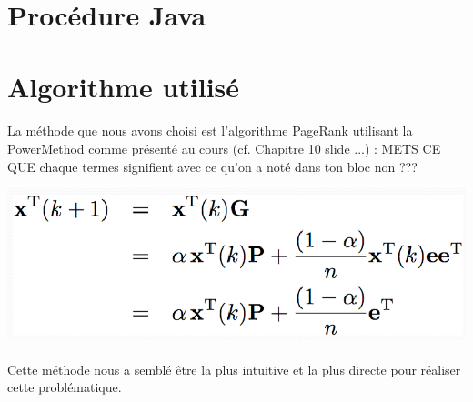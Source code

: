 \documentclass[10pt,a4paper]{article}
\begin{document}



\newpage

\section{Procédure Java}
\section{Algorithme utilisé}

\paragraph{}La méthode que nous avons choisi est l'algorithme PageRank utilisant la PowerMethod comme présenté au cours (cf. Chapitre 10 slide ...) : METS CE QUE chaque termes signifient avec ce qu'on a noté dans ton bloc non ???
\begin{center}
\includegraphics[scale=0.4]{PowerMethod.png} 
\end{center}



\paragraph{}Cette méthode nous a semblé être la plus intuitive et la plus directe pour réaliser cette problématique.
\end{document}
